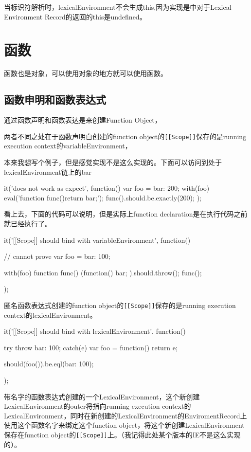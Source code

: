 当标识符解析时，lexicalEnvironment不会生成this,因为实现是中对于Lexical Environment Record的返回的this是undefined。

\section{函数}
函数也是对象，可以使用对象的地方就可以使用函数。

\subsection{函数申明和函数表达式}	
通过函数声明和函数表达是来创建Function Object，

两者不同之处在于函数声明白创建的function object的\lstinline![[Scope]]!保存的是running execution context的variableEnvironment，

本来我想写个例子，但是感觉实现不是这么实现的。下面可以访问到处于lexicalEnvironment链上的bar
\begin{JavaScript}
		it('does not work as expect', function(){
			var foo = {bar: 200};
			with(foo) {
				eval('function func(){return bar;}');
			}
			func().should.be.exactly(200);
		});
\end{JavaScript}
看上去，下面的代码可以说明，但是实际上function declaration是在执行代码之前就已经执行了。
\begin{JavaScript}
		it('[[Scope]] should bind with variableEnvironment', function(){
			// cannot prove
			var foo = {bar: 100};

			with(foo) {
				function func() {
					(function(){
						bar;
					}).should.throw();
				}
			}
			func();
		});
\end{JavaScript}

匿名函数表达式创建的function object的\lstinline![[Scope]]!保存的是running execution context的lexicalEnvironment。
\begin{JavaScript}
		it('[[Scope]] should bind with lexicalEnvironment', function(){

			try {
				throw {bar: 100};
			} catch(e) {
				var foo = function(){
					return e;
				}
			}

			should(foo()).be.eql({bar: 100});
		});
\end{JavaScript}

带名字的函数表达式创建的一个LexicalEnvironment，这个新创建LexicalEnvironment的outer将指向running execution context的LexicalEnvironment，同时在新创建的LexicalEnvironment的EnviromentRecord上使用这个函数名字来绑定这个function object，将这个新创建LexicalEnvironment保存在function object的\lstinline![[Scope]]!上。（我记得此处某个版本的IE不是这么实现的）。

